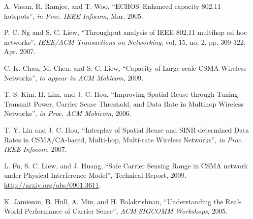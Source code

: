 \documentclass[conference]{IEEEtran}
\begin{document}
\begin{thebibliography}{99}
A. Vasan, R. Ramjee, and T. Woo, ``ECHOS--Enhanced capacity 802.11
hotspots'', \textit{in Proc. IEEE Infocom}, Mar. 2005.



P. C. Ng and S. C. Liew, ``Throughput analysis of IEEE 802.11
multihop ad hoc networks'', \textit{IEEE/ACM Transactions on
Networking}, vol. 15, no. 2, pp. 309-322, Apr. 2007.

C. K. Chau, M. Chen, and S. C. Liew, ``Capacity of Large-scale CSMA
Wireless Networks'', \textit{to appear in ACM Mobicom}, 2009.

T. S. Kim, H. Lim, and J. C. Hou, ``Improving Spatial Reuse through
Tuning Transmit Power, Carrier Sense Threshold, and Data Rate in
Multihop Wireless Networks'', \textit{in Proc. ACM Mobicom}, 2006.



T. Y. Lin and J. C. Hou, ``Interplay of Spatial Reuse and
SINR-determined Data Rates in CSMA/CA-based, Multi-hop, Multi-rate
Wireless Networks'', \textit{in Proc. IEEE Infocom}, 2007.



L. Fu, S. C. Liew, and J. Huang, ``Safe Carrier Sensing Range in
CSMA network under Physical Interference Model'', Technical Report,
2009. \url{http://arxiv.org/abs/0901.3611}.

K. Jamieson, B. Hull, A. Miu, and H. Balakrishnan, ``Understanding
the Real-World Performance of Carrier Sense'', \textit{ACM SIGCOMM
Workshops}, 2005.


\end{thebibliography}
\end{document}

